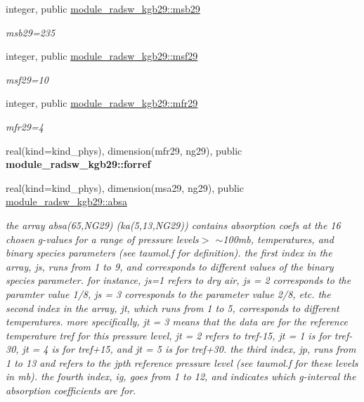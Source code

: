 \begin{Indent}
\begin{DoxyCompactItemize}
integer, public \hyperlink{group__module__radsw__kgbnn_gadd8e18a273d5fa133f22fb47c4d722da}{module\+\_\+radsw\+\_\+kgb29\+::msb29}
\begin{DoxyCompactList}\small\item\em msb29=235 \end{DoxyCompactList}\item 
integer, public \hyperlink{group__module__radsw__kgbnn_gace849342fcb0d18d825318a2ee26ce0e}{module\+\_\+radsw\+\_\+kgb29\+::msf29}
\begin{DoxyCompactList}\small\item\em msf29=10 \end{DoxyCompactList}\item 
integer, public \hyperlink{group__module__radsw__kgbnn_ga866ce18e53b84d75d51dd8c6a999ee7b}{module\+\_\+radsw\+\_\+kgb29\+::mfr29}
\begin{DoxyCompactList}\small\item\em mfr29=4 \end{DoxyCompactList}\item 
real(kind=kind\+\_\+phys), dimension(mfr29, ng29), public {\bfseries module\+\_\+radsw\+\_\+kgb29\+::forref}
\item 
real(kind=kind\+\_\+phys), dimension(msa29, ng29), public \hyperlink{group__module__radsw__kgbnn_ga1132fd19edc0312f6bcc905619f3bdfd}{module\+\_\+radsw\+\_\+kgb29\+::absa}
\begin{DoxyCompactList}\small\item\em the array absa(65,\+N\+G29) (ka(5,13,\+N\+G29)) contains absorption coefs at the 16 chosen g-\/values for a range of pressure levels$>$ $\sim$100mb, temperatures, and binary species parameters (see taumol.\+f for definition). the first index in the array, js, runs from 1 to 9, and corresponds to different values of the binary species parameter. for instance, js=1 refers to dry air, js = 2 corresponds to the paramter value 1/8, js = 3 corresponds to the parameter value 2/8, etc. the second index in the array, jt, which runs from 1 to 5, corresponds to different temperatures. more specifically, jt = 3 means that the data are for the reference temperature tref for this pressure level, jt = 2 refers to tref-\/15, jt = 1 is for tref-\/30, jt = 4 is for tref+15, and jt = 5 is for tref+30. the third index, jp, runs from 1 to 13 and refers to the jpth reference pressure level (see taumol.\+f for these levels in mb). the fourth index, ig, goes from 1 to 12, and indicates which g-\/interval the absorption coefficients are for. \end{DoxyCompactList}\item 

\end{DoxyCompactItemize}
\end{Indent}
